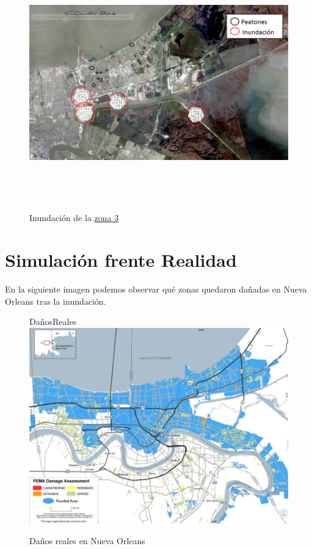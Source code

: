 \begin{figure}[H]
 \centering
 \includegraphics[height=110mm,angle=90]{figuras/cap6/resultados/katrina3.png}
 \caption{Inundación de la \hyperref[zona3]{zona 3}}
\end{figure}

\section{Simulación frente Realidad}

En la siguiente imagen podemos observar qué zonas quedaron dañadas en Nueva
Orleans tras la inundación\cite{Gabe05}.

\begin{figure}[H]{DañosReales}
 \centering
 \includegraphics[width=135mm]{figuras/cap6/NOdamage.png}
 \caption{Daños reales en Nueva Orleans}
\end{figure}

